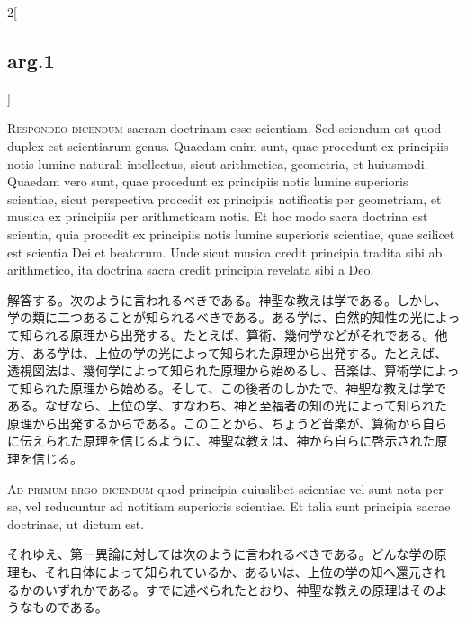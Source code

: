 \documentclass[
paper=a4paper,
fontsize=10pt,
jafontsize=9pt,
titlepage
]{jlreq}
\begin{document}
\begin{paracol}{2}[\subsection{arg.1}]

{\scshape Respondeo dicendum} sacram doctrinam esse scientiam. Sed
sciendum est quod duplex est scientiarum genus. Quaedam enim sunt,
quae procedunt ex principiis notis lumine naturali intellectus, sicut
arithmetica, geometria, et huiusmodi. Quaedam vero sunt, quae
procedunt ex principiis notis lumine superioris scientiae, sicut
perspectiva procedit ex principiis notificatis per geometriam, et
musica ex principiis per arithmeticam notis. Et hoc modo sacra
doctrina est scientia, quia procedit ex principiis notis lumine
superioris scientiae, quae scilicet est scientia Dei et beatorum. Unde
sicut musica credit principia tradita sibi ab arithmetico, ita
doctrina sacra credit principia revelata sibi a Deo.

\switchcolumn

解答する。次のように言われるべきである。神聖な教えは学である。しかし、
学の類に二つあることが知られるべきである。ある学は、自然的知性の光によっ
て知られる原理から出発する。たとえば、算術、幾何学などがそれである。他
方、ある学は、上位の学の光によって知られた原理から出発する。たとえば、
透視図法は、幾何学によって知られた原理から始めるし、音楽は、算術学によっ
て知られた原理から始める。そして、この後者のしかたで、神聖な教えは学で
ある。なぜなら、上位の学、すなわち、神と至福者の知の光によって知られた
原理から出発するからである。このことから、ちょうど音楽が、算術から自ら
に伝えられた原理を信じるように、神聖な教えは、神から自らに啓示された原
理を信じる。

\switchcolumn*[\subsection{ad.1}]

{\scshape Ad primum ergo dicendum} quod principia cuiuslibet scientiae
vel sunt nota per se, vel reducuntur ad notitiam superioris
scientiae. Et talia sunt principia sacrae doctrinae, ut dictum est.

\switchcolumn

それゆえ、第一異論に対しては次のように言われるべきである。どんな学の原
理も、それ自体によって知られているか、あるいは、上位の学の知へ還元され
るかのいずれかである。すでに述べられたとおり、神聖な教えの原理はそのよ
うなものである。

\switchcolumn*[\subsection{ad.2}]


\end{paracol}
\end{document}

